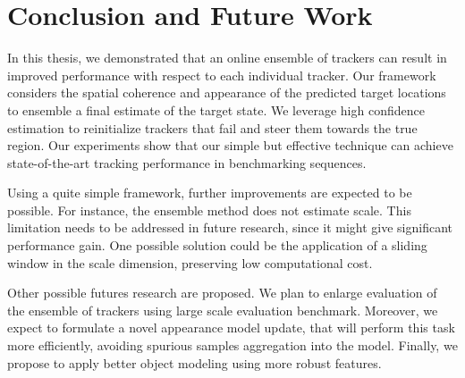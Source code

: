 \chapter{Conclusion and Future Work}
\label{chapter::conclusions}

In this thesis, we demonstrated that an online ensemble of trackers can result
in improved performance with respect to each individual tracker. Our framework
considers the spatial coherence and appearance of the predicted target locations
to ensemble a final estimate of the target state. We leverage high confidence
estimation to reinitialize trackers that fail and steer them towards the true
region. Our experiments show that our simple but effective technique can achieve
state-of-the-art tracking performance in benchmarking sequences. 

Using a quite simple framework, further improvements are expected to be
possible. For instance, the ensemble method does not estimate scale. This
limitation needs to be addressed in future research, since it might give
significant performance gain. One possible solution could be the application of
a sliding window in the scale dimension, preserving low computational cost.

Other possible futures research are proposed. We plan to enlarge evaluation of
the ensemble of trackers using large scale evaluation benchmark. Moreover, we
expect to formulate a novel appearance model update, that will perform this task more efficiently, avoiding spurious samples aggregation into the model. Finally,
we propose to apply better object modeling using more robust features.